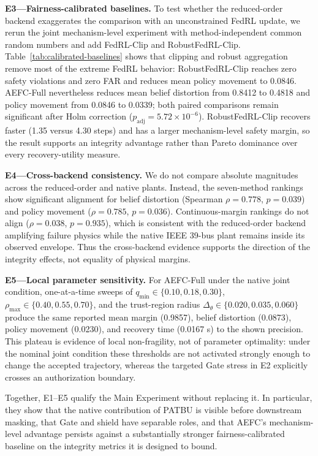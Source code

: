 

\textbf{E3---Fairness-calibrated baselines.}
To test whether the reduced-order backend exaggerates the comparison with an unconstrained FedRL update, we rerun the joint mechanism-level experiment with method-independent common random numbers and add FedRL-Clip and RobustFedRL-Clip. Table~\ref{tab:calibrated-baselines} shows that clipping and robust aggregation remove most of the extreme FedRL behavior: RobustFedRL-Clip reaches zero safety violations and zero FAR and reduces mean policy movement to 0.0846. AEFC-Full nevertheless reduces mean belief distortion from 0.8412 to 0.4818 and policy movement from 0.0846 to 0.0339; both paired comparisons remain significant after Holm correction ($p_{\mathrm{adj}}=5.72\times10^{-6}$). RobustFedRL-Clip recovers faster (1.35 versus 4.30 steps) and has a larger mechanism-level safety margin, so the result supports an integrity advantage rather than Pareto dominance over every recovery-utility measure.



\textbf{E4---Cross-backend consistency.}
We do not compare absolute magnitudes across the reduced-order and native plants. Instead, the seven-method rankings show significant alignment for belief distortion (Spearman $\rho=0.778$, $p=0.039$) and policy movement ($\rho=0.785$, $p=0.036$). Continuous-margin rankings do not align ($\rho=0.038$, $p=0.935$), which is consistent with the reduced-order backend amplifying failure physics while the native IEEE 39-bus plant remains inside its observed envelope. Thus the cross-backend evidence supports the direction of the integrity effects, not equality of physical margins.

\textbf{E5---Local parameter sensitivity.}
For AEFC-Full under the native joint condition, one-at-a-time sweeps of $q_{\min}\in\{0.10,0.18,0.30\}$, $\rho_{\max}\in\{0.40,0.55,0.70\}$, and the trust-region radius $\Delta_\theta\in\{0.020,0.035,0.060\}$ produce the same reported mean margin (0.9857), belief distortion (0.0873), policy movement (0.0230), and recovery time (0.0167 s) to the shown precision. This plateau is evidence of local non-fragility, not of parameter optimality: under the nominal joint condition these thresholds are not activated strongly enough to change the accepted trajectory, whereas the targeted Gate stress in E2 explicitly crosses an authorization boundary.

Together, E1--E5 qualify the Main Experiment without replacing it. In particular, they show that the native contribution of PATBU is visible before downstream masking, that Gate and shield have separable roles, and that AEFC's mechanism-level advantage persists against a substantially stronger fairness-calibrated baseline on the integrity metrics it is designed to bound.
